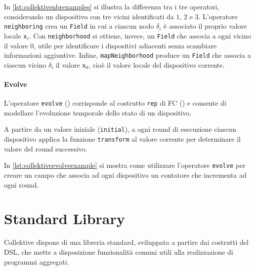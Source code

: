 In \cref{lst:collektivenbrexamples} si illustra la differenza tra i tre operatori, considerando un dispositivo con tre vicini identificati da \(1\), \(2\) e \(3\). L’operatore \texttt{neighboring} crea un \texttt{Field} in cui a ciascun nodo \(\delta_i\) è associato il proprio valore locale \texttt{x\(_i\)}. Con \texttt{neighborhood} si ottiene, invece, un \texttt{Field} che associa a ogni vicino il valore \(0\), utile per identificare i dispositivi adiacenti senza scambiare informazioni aggiuntive. Infine, \texttt{mapNeighborhood} produce un \texttt{Field} che associa a ciascun vicino \(\delta_i\) il valore \texttt{x\(_0\)}, cioè il valore locale del dispositivo corrente.
%


\paragraph{Evolve} L'operatore \texttt{evolve} () corrisponde al costrutto \texttt{rep} di \ac{FC} () e consente di modellare l'evoluzione temporale dello stato di un dispositivo.
%

%
A partire da un valore iniziale (\texttt{initial}), a ogni round di esecuzione ciascun dispositivo applica la funzione \texttt{transform} al valore corrente per determinare il valore del round successivo.

In \cref{lst:collektiveevolveexample} si mostra come utilizzare l'operatore \texttt{evolve} per creare un campo che associa ad ogni dispositivo un contatore che incrementa ad ogni round.
%


\section{Standard Library}
\label{sec:collektivelibrary}

Collektive dispone di una libreria standard, sviluppata a partire dai costrutti del \ac{DSL}, che mette a disposizione funzionalità comuni utili alla realizzazione di programmi aggregati.

